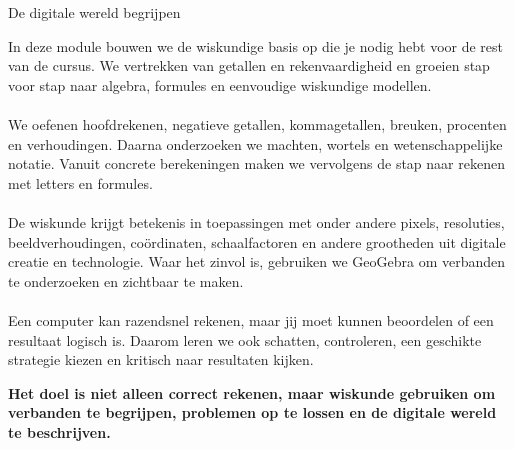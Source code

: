 
\ifdefined\HCode
\else
  \FVDmoduleopening
    {De digitale wereld begrijpen}
    {In deze module bouwen we de wiskundige basis op die je nodig hebt voor de rest van de cursus. We vertrekken van getallen en rekenvaardigheid en groeien stap voor stap naar algebra, formules en eenvoudige wiskundige modellen. \\ \ \\ We oefenen hoofdrekenen, negatieve getallen, kommagetallen, breuken, procenten en verhoudingen. Daarna onderzoeken we machten, wortels en wetenschappelijke notatie. Vanuit concrete berekeningen maken we vervolgens de stap naar rekenen met letters en formules. \\ \ \\ De wiskunde krijgt betekenis in toepassingen met onder andere pixels, resoluties, beeldverhoudingen, coördinaten, schaalfactoren en andere grootheden uit digitale creatie en technologie. Waar het zinvol is, gebruiken we GeoGebra om verbanden te onderzoeken en zichtbaar te maken. \\ \ \\ Een computer kan razendsnel rekenen, maar jij moet kunnen beoordelen of een resultaat logisch is. Daarom leren we ook schatten, controleren, een geschikte strategie kiezen en kritisch naar resultaten kijken. \begin{center} \textbf{Het doel is niet alleen correct rekenen, maar wiskunde gebruiken om verbanden te begrijpen, problemen op te lossen en de digitale wereld te beschrijven.} \end{center}}
    {%
    }
\fi
